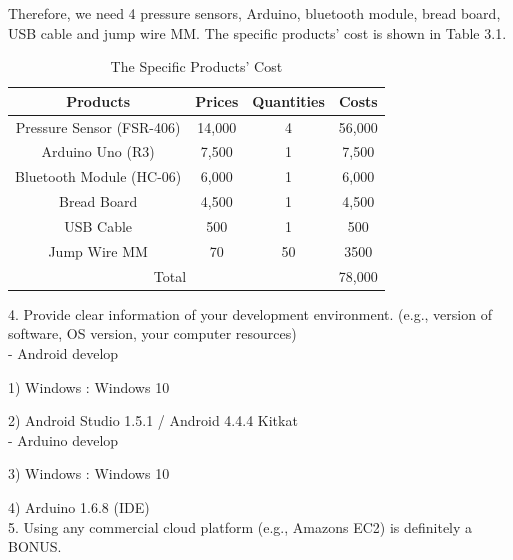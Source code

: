 \documentclass[conference]{IEEEtran}
\begin{document}
Therefore, we need 4 pressure sensors, Arduino, bluetooth module, bread board, USB cable and jump wire MM. The specific products' cost is shown in Table 3.1.\\
\begin{center}

\begin{table}[H]
\caption{The Specific Products' Cost }
\begin{tabular}{|c|c|c|c|}\hline


Products & Prices & Quantities & Costs \\ \hline \hline

Pressure Sensor (FSR-406) & 14,000 & 4 & 56,000  \\ \hline 

Arduino Uno (R3) & 7,500 & 1 & 7,500 \\ \hline

Bluetooth Module (HC-06) & 6,000 & 1  & 6,000 \\ \hline

Bread Board & 4,500 & 1 & 4,500 \\\hline

USB Cable & 500 & 1 & 500  \\ \hline

Jump Wire MM& 70 & 50 & 3500  \\ \hline

\multicolumn{3}{|c|}{Total} & \multicolumn{1}{|l|}{78,000} \\ \hline 

\end{tabular}
\end{table}
\end{center}

4.	Provide clear information of your development environment. (e.g., version of software, OS version, your computer resources)\\

-	Android develop

1)	Windows : Windows 10

2)	Android Studio 1.5.1 / Android 4.4.4 Kitkat\\

-	Arduino develop 

3)	Windows : Windows 10

4)	Arduino 1.6.8 (IDE)\\


5.	Using any commercial cloud platform (e.g., Amazons EC2) is definitely a BONUS.\\
\end{document}
